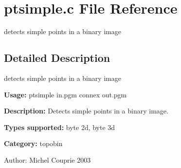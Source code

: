 \section{ptsimple.c File Reference}
\label{ptsimple_8c}
detects simple points in a binary image  




\label{_details}
\subsection{Detailed Description}
detects simple points in a binary image 

{\bf Usage:} ptsimple in.pgm connex out.pgm

{\bf Description:} Detects simple points in a binary image.

{\bf Types supported:} byte 2d, byte 3d

{\bf Category:} topobin

\begin{Desc}
\item[Author:]Michel Couprie 2003 \end{Desc}
